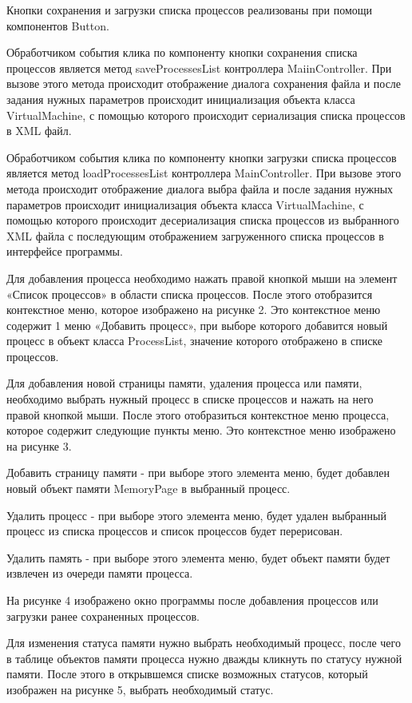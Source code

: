 \documentclass[russian,utf8,simple,hpadding=10mm,vpadding=20mm]{eskdtext}
\begin{document}
Кнопки сохранения и загрузки списка процессов реализованы при помощи компонентов Button.

Обработчиком события клика по компоненту кнопки сохранения списка процессов является метод saveProcessesList контроллера MaiinController. При вызове этого метода происходит отображение диалога сохранения файла и после задания нужных параметров происходит инициализация объекта класса VirtualMachine, с помощью которого происходит сериализация списка процессов в XML файл.

Обработчиком события клика по компоненту кнопки загрузки списка процессов является метод loadProcessesList контроллера MainController. При вызове этого метода происходит отображение диалога выбра файла и после задания нужных параметров происходит инициализация объекта класса VirtualMachine, с помощью которого происходит десериализация списка процессов из выбранного XML файла с последующим отображением загруженного списка процессов в интерфейсе программы.
 
Для добавления процесса необходимо нажать правой кнопкой мыши на элемент «Список процессов» в области списка процессов. После этого отобразится контекстное меню, которое изображено на рисунке 2. Это контекстное меню содержит 1 меню «Добавить процесс», при выборе которого добавится новый процесс в объект класса ProcessList, значение которого отображено в списке процессов. 

Для добавления новой страницы памяти, удаления процесса или памяти, необходимо выбрать нужный процесс в списке процессов и нажать на него правой кнопкой мыши. После этого отобразиться контекстное меню процесса, которое содержит следующие пункты меню. Это контекстное меню изображено на рисунке 3.

Добавить страницу памяти - при выборе этого элемента меню, будет добавлен новый объект памяти MemoryPage в выбранный процесс.

Удалить процесс - при выборе этого элемента меню, будет удален выбранный процесс из списка процессов и список процессов будет перерисован.

Удалить память - при выборе этого элемента меню, будет объект памяти будет извлечен из очереди памяти процесса.

На рисунке 4 изображено окно программы после добавления процессов или загрузки ранее сохраненных процессов.

Для изменения статуса памяти нужно выбрать необходимый процесс, после чего в таблице объектов памяти процесса нужно дважды кликнуть по статусу нужной памяти. После этого в открывшемся списке возможных статусов, который изображен на рисунке 5, выбрать необходимый статус.
\end{document}
